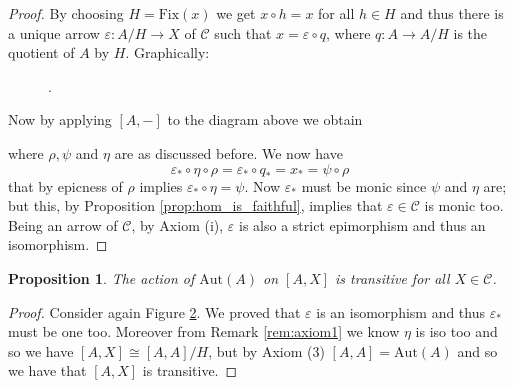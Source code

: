 \documentclass[italian, 12pt, reqno]{article}
\theoremstyle{myteo}
\newtheorem{proposition}[theorem]{Proposition}
\numberwithin{equation}{section}
\newcommand{\cat}[1]{\mathscr{#1}}
\newcommand{\fix}[1]{\text{Fix}(#1)}
\newcommand{\homs}[2]{[#1, #2]}
\newcommand{\fun}[3]{#1\colon#2\to #3}
\begin{document}
\begin{proof}
  By choosing \(H = \fix{x}\) we get \(x\circ h = x\) for all \(h\in H\) and thus there is a unique arrow \(\fun{\varepsilon}{A/H}{X}\) of \(\cat{C}\) such that \(x = \varepsilon\circ q\), where \(\fun{q}{A}{A/H}\) is the quotient of \(A\) by \(H\).
  Graphically:

  \begin{figure}
    \begin{center}
      .
    \end{center}
    \caption{}
    \label{diagram:varepsilon}
  \end{figure}

  Now by applying \(\homs{A}{-}\) to the diagram above we obtain

  \begin{figure}
    \begin{center}
    \end{center}
    \caption{}
    \label{diagram:big_diagram}
  \end{figure}
  where \(\rho, \psi\) and \(\eta\) are as discussed before.
  We now have
  \[\varepsilon_*\circ \eta\circ\rho = \varepsilon_*\circ q_* = x_* = \psi\circ \rho\]
  that by epicness of \(\rho\) implies \(\varepsilon_*\circ \eta = \psi\).
  Now \(\varepsilon_*\) must be monic since \(\psi\) and \(\eta\) are; but this, by Proposition \ref{prop:hom_is_faithful}, implies that \(\varepsilon\in\cat{C}\) is monic too.
  Being an arrow of \(\cat{C}\), by Axiom (i), \(\varepsilon\) is also a strict epimorphism and thus an isomorphism.
\end{proof}

\begin{proposition}
  \label{prop:transitive_action}
  The action of \(\text{Aut}(A)\) on \(\homs{A}{X}\) is transitive for all \(X\in\cat{C}\).
\end{proposition}

\begin{proof}
  Consider again Figure \ref{diagram:big_diagram}.
  We proved that \(\varepsilon\) is an isomorphism and thus \(\varepsilon_*\) must be one too.
  Moreover from Remark \ref{rem:axiom1} we know \(\eta\) is iso too and so we have \(\homs{A}{X}\cong \homs{A}{A}/H\), but by Axiom (3) \(\homs{A}{A} = \text{Aut}(A)\) and so we have that \(\homs{A}{X}\) is transitive.
\end{proof}
\end{document}
